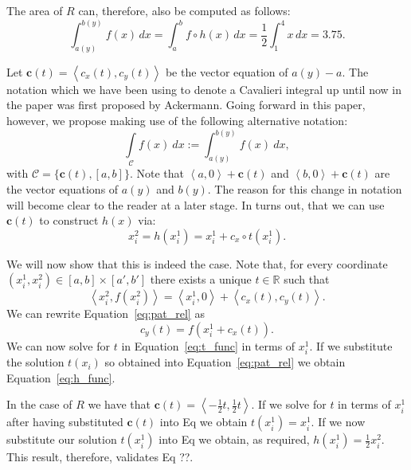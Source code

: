 \documentclass{article}
\theoremstyle{theorem}
\theoremstyle{definition}
\begin{document}
\noindent
The area of $R$ can, therefore, also be computed as follows:
\begin{equation}
\int_{a(y)}^{b(y)}f(x)\, dx = \int_a^b f \circ h (x)\, dx = \dfrac{1}{2}\int_1^4x\, dx = 3.75.  
\end{equation}

Let $\mathbf{c}(t) = \left <c_x(t),c_y(t) \right>$ be the vector equation of $a(y)-a$. The notation which we have been using to denote a Cavalieri integral up until now 
in the paper was first proposed by Ackermann. Going forward in this paper, however, we propose making use of the following alternative notation:
\begin{equation}
\label{eq:new_def_cavalieri}
\int \limits_{\mathcal{C}} f(x)~dx := \int_{a(y)}^{b(y)}f(x)~dx,
\end{equation}
with $\mathcal{C} = \{\mathbf{c}(t),[a,b]\}$. Note that $\left<a,0\right> + \mathbf{c}(t)$ and $\left<b,0\right> + \mathbf{c}(t)$ are the vector equations of $a(y)$ and 
$b(y)$. The reason for this change in notation will become clear to the reader at a later stage. In turns out, that we can use $\mathbf{c}(t)$ to construct $h(x)$ via:
\begin{equation}
\label{eq:h_func}
x_i^2 = h(x_i^1) = x_i^1 + c_x\circ t(x_i^1).
\end{equation}

\noindent
We will now show that this is indeed the case. Note that, for every coordinate $(x_i^1,x_i^2) \in [a,b] \times [a',b']$ there exists a unique $t\in\mathbb{R}$ such that
\begin{equation}
\label{eq:pat_rel}
\left <x_i^2,f(x_i^2) \right > = \left <x_i^1,0 \right> + \left<c_x(t),c_y(t) \right >.
\end{equation}
We can rewrite Equation~\eqref{eq:pat_rel} as
\begin{equation}
\label{eq:t_func}
c_y(t) = f(x_i^1 + c_x(t)).
\end{equation}
We can now solve for $t$ in Equation~\eqref{eq:t_func} in terms of $x_i^1$. If we substitute the solution $t(x_i)$ so obtained into Equation~\ref{eq:pat_rel} we obtain Equation~\ref{eq:h_func}.

In the case of $R$ we have that $\mathbf{c}(t) = \left<-\frac{1}{2} t,\frac{1}{2} t\right>$. If we solve for $t$ in terms of $x_i^1$ after having substituted $\mathbf{c}(t)$ into Eq we obtain 
$t(x_i^1) = x_i^1$. If we now substitute our solution $t(x_i^1)$ into Eq we obtain, as required, $h(x_i^1) = \frac{1}{2}x_i^2$. This result, therefore, validates Eq ??.
\end{document}
